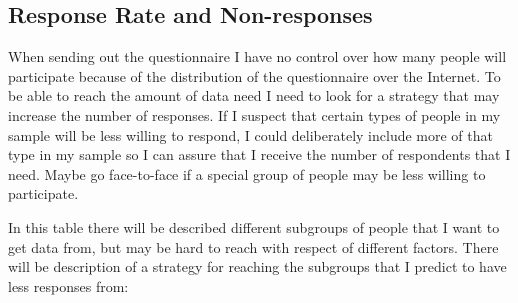   \subsection{Response Rate and Non-responses} \label{sec:response}

    When sending out the questionnaire I have no control over how many people will participate because of the distribution of the questionnaire over the Internet. To be able to reach the amount of data need I need to look for a strategy that may increase the number of responses. If I suspect that certain types of people in my sample will be less willing to respond, I could deliberately include more of that type in my sample so I can assure that I receive the number of respondents that I need. Maybe go face-to-face if a special group of people may be less willing to participate. 

    In this table there will be described different subgroups of people that I want to get data from, but may be hard to reach with respect of different factors. There will be description of a strategy for reaching the subgroups that I predict to have less responses from:

